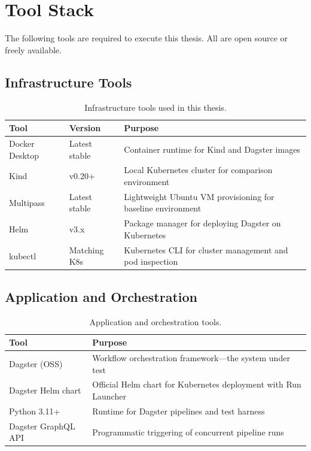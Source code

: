 
\section{Tool Stack}
\label{sec:tools}

The following tools are required to execute this thesis. All are open source or freely available.

\subsection{Infrastructure Tools}
\label{subsec:infra-tools}

\begin{table}[H]
  \centering
  \caption{Infrastructure tools used in this thesis.}
  \label{tab:infra-tools}
  \small
  \begin{tabularx}{\textwidth}{llX}
    \toprule
    \textbf{Tool} & \textbf{Version} & \textbf{Purpose} \\
    \midrule
    Docker Desktop  & Latest stable   & Container runtime for Kind and Dagster images \\
    Kind            & v0.20+          & Local Kubernetes cluster for comparison environment \\
    Multipass       & Latest stable   & Lightweight Ubuntu VM provisioning for baseline environment \\
    Helm            & v3.x            & Package manager for deploying Dagster on Kubernetes \\
    kubectl         & Matching K8s    & Kubernetes CLI for cluster management and pod inspection \\
    \bottomrule
  \end{tabularx}
\end{table}

\subsection{Application and Orchestration}
\label{subsec:app-tools}

\begin{table}[H]
  \centering
  \caption{Application and orchestration tools.}
  \label{tab:app-tools}
  \small
  \begin{tabularx}{\textwidth}{lX}
    \toprule
    \textbf{Tool} & \textbf{Purpose} \\
    \midrule
    Dagster (OSS)           & Workflow orchestration framework---the system under test \\
    Dagster Helm chart      & Official Helm chart for Kubernetes deployment with Run Launcher \\
    Python 3.11+            & Runtime for Dagster pipelines and test harness \\
    Dagster GraphQL API     & Programmatic triggering of concurrent pipeline runs \\
    \bottomrule
  \end{tabularx}
\end{table}

